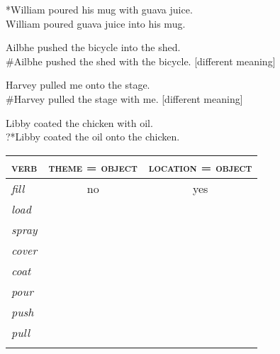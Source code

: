 {\ea
    \label{ex:7:4}
\ea%
 *William poured his mug with guava juice.\\
\ex  William poured guava juice into his mug.
    \z
\z

\ea
    \label{ex:7:5}
\ea%
Ailbhe pushed the bicycle into the shed.\\
\ex \#Ailbhe pushed the shed with the bicycle.  [different meaning]
    \z
\z

\ea
    \label{ex:7:6}
\ea%
 Harvey pulled me onto the stage.\\
\ex \#Harvey pulled the stage with me.   [different meaning]
    \z
\z

\ea
    \label{ex:7:7}
\ea%
 Libby coated the chicken with oil.\\
\ex ?*Libby coated the oil onto the chicken.
    \z
\z

\ea
    \label{ex:7:8}
    \z
\z

\noindent
\begin{tabularx}{\textwidth}{lCC}
\lsptoprule
\scshape verb & \scshape theme = object & \scshape location = object\\\midrule
\itshape fill & no & yes \\
\midrule
\itshape load &  & \\
\midrule
\itshape spray &  & \\
\midrule
\itshape cover &  & \\
\midrule
\itshape coat &  & \\
\midrule
\itshape pour &  & \\
\midrule
\itshape push &  & \\
\midrule
\itshape pull &  & \\
\lspbottomrule
\end{tabularx}
}

